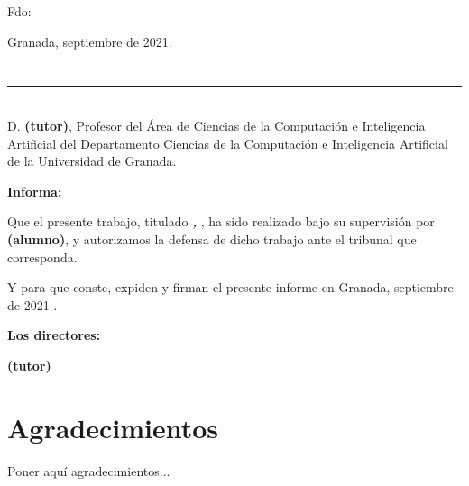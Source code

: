 \vspace{6cm}

\noindent Fdo: \myName

\vspace{2cm}

\begin{flushright}
Granada, septiembre de 2021.
\end{flushright}


\chapter*{}
\thispagestyle{empty}

\noindent\rule[-1ex]{\textwidth}{2pt}\\[4.5ex]

D. \textbf{\myProf  (tutor)}, Profesor del Área de Ciencias de la Computación e Inteligencia Artificial del Departamento Ciencias de la Computación e Inteligencia Artificial de la Universidad de Granada.

\vspace{0.5cm}

\textbf{Informa:}

\vspace{0.5cm}

Que el presente trabajo, titulado \textit{\textbf{\myTitle, \mySubtitle}},
ha sido realizado bajo su supervisión por \textbf{\myName (alumno)}, y autorizamos la defensa de dicho trabajo ante el tribunal
que corresponda.

\vspace{0.5cm}

Y para que conste, expiden y firman el presente informe en Granada, septiembre de 2021 .

\vspace{1cm}

\textbf{Los directores:}

\vspace{5cm}

\noindent \textbf{\myProf (tutor)}

\chapter*{Agradecimientos}
\thispagestyle{empty}

       \vspace{1cm}


Poner aquí agradecimientos...

